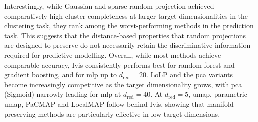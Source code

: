 Interestingly, while Gaussian and sparse random projection achieved comparatively high cluster completeness at larger target dimensionalities in the clustering task,
they rank among the worst-performing methods in the prediction task.
This suggests that the distance-based properties that random projections are designed to preserve do not necessarily retain the discriminative information required for predictive modelling.
Overall, while most methods achieve comparable accuracy, Ivis consistently performs best for random forest and gradient boosting, and for \gls{mlp} up to $d_{\mathrm{red}}=20$. LoLP and the \gls{pca} variants become increasingly competitive as the target dimensionality grows, with \gls{pca} (Sigmoid) narrowly leading for \gls{mlp} at $d_{\mathrm{red}}=40$. At $d_{\mathrm{red}}=5$, \gls{umap}, parametric \gls{umap}, PaCMAP and LocalMAP follow behind Ivis, showing that manifold-preserving methods are particularly effective in low target dimensions.

